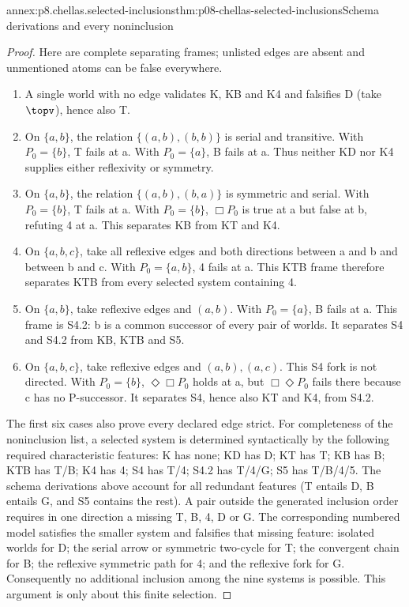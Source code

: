 \begin{annexitem}{annex:p8.chellas.selected-inclusions}{thm:p08-chellas-selected-inclusions}{Schema derivations and every noninclusion}
\begin{proof}
Here are complete separating frames; unlisted edges are absent and
unmentioned atoms can be false everywhere.
\begin{enumerate}
\item A single world with no edge validates K, KB and K4 and falsifies
 D (take \(\topv\)), hence also T.
\item On \(\{a,b\}\), the relation \(\{(a,b),(b,b)\}\) is
 serial and transitive. With \(P_0=\{b\}\), T fails at a.
 With \(P_0=\{a\}\), B fails at a. Thus neither KD nor K4
 supplies either reflexivity or symmetry.
\item On \(\{a,b\}\), the relation \(\{(a,b),(b,a)\}\) is
 symmetric and serial. With \(P_0=\{b\}\), T fails at a.
 With \(P_0=\{b\}\), \(\Box P_0\) is true at a but false
 at b, refuting 4 at a. This separates KB from KT and K4.
\item On \(\{a,b,c\}\), take all reflexive edges and both
 directions between a and b and between b and c. With
 \(P_0=\{a,b\}\), 4 fails at a. This KTB frame therefore
 separates KTB from every selected system containing 4.
\item On \(\{a,b\}\), take reflexive edges and \((a,b)\).
 With \(P_0=\{a\}\), B fails at a. This frame is S4.2:
 b is a common successor of every pair of worlds. It separates
 S4 and S4.2 from KB, KTB and S5.
\item On \(\{a,b,c\}\), take reflexive edges and
 \((a,b),(a,c)\). This S4 fork is not directed. With
 \(P_0=\{b\}\), \(\Diamond\Box P_0\) holds at a, but
 \(\Box\Diamond P_0\) fails there because c has no P-successor.
 It separates S4, hence also KT and K4, from S4.2.
\end{enumerate}
The first six cases also prove every declared edge strict. For completeness
of the noninclusion list, a selected system is determined syntactically by
the following required characteristic features: K has none; KD has D;
KT has T; KB has B; KTB has T/B; K4 has 4; S4 has T/4;
S4.2 has T/4/G; S5 has T/B/4/5. The schema derivations above account
for all redundant features (T entails D, B entails G, and S5 contains
the rest). A pair outside the generated inclusion order requires in
one direction a missing T, B, 4, D or G. The corresponding numbered
model satisfies the smaller system and falsifies that missing feature:
isolated worlds for D; the serial arrow or symmetric two-cycle for T;
the convergent chain for B; the reflexive symmetric path for 4;
and the reflexive fork for G. Consequently no additional inclusion
among the nine systems is possible. This argument is only about this
finite selection.
\end{proof}
\end{annexitem}

